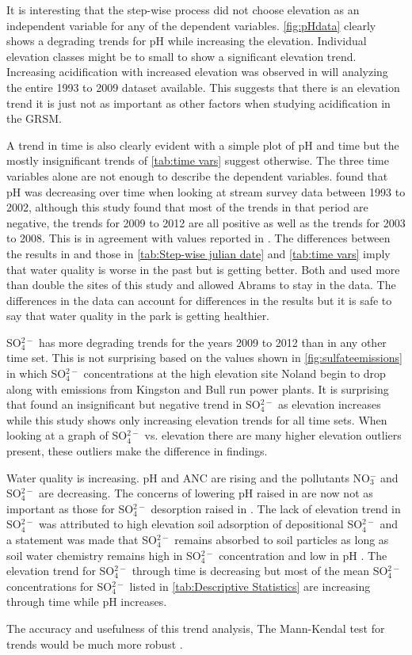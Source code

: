 It is interesting that the step-wise process did not choose elevation as an independent variable for any of the dependent variables. \autoref{fig:pHdata} clearly shows a degrading trends for pH while increasing the elevation. Individual elevation classes might be to small to show a significant elevation trend.  Increasing acidification with increased elevation was observed in \citet{cai2012} will analyzing the entire 1993 to 2009 dataset available.  This suggests that there is an elevation trend it is just not as important as other factors when studying acidification in the GRSM.

A trend in time is also clearly evident with a simple plot of pH and time but the mostly insignificant trends of \autoref{tab:time vars} suggest otherwise. The three time variables alone are not enough to describe the dependent variables.  \citet{robinson2008ph} found that pH was decreasing over time when looking at stream survey data between 1993 to 2002, although this study found that most of the trends in that period are negative, the trends for 2009 to 2012 are all positive as well as the trends for 2003 to 2008.  This is in agreement with values reported in \citet{cai2012}.  The differences between the results in \citet{robinson2008ph} and those in \autoref{tab:Step-wise julian date} and \autoref{tab:time vars} imply that water quality is worse in the past but is getting better.  Both \citet{robinson2008ph} and \citet{cai2012} used more than double the sites of this study and \citet{robinson2008ph} allowed Abrams to stay in the data.  The differences in the data can account for differences in the results but it is safe to say that water quality in the park is getting healthier.

SO$_4^{2-}$ has more degrading trends for the years 2009 to 2012 than in any other time set. This is not surprising based on the values shown in \autoref{fig:sulfateemissions} in which SO$_4^{2-}$ concentrations at the high elevation site Noland begin to drop along with emissions from Kingston and Bull run power plants.  It is surprising that \cite{cai2012} found an insignificant but negative trend in SO$_4^{2-}$ as elevation increases while this study shows only increasing elevation trends for all time sets.  When looking at a graph of SO$_4^{2-}$ vs. elevation there are many higher elevation outliers present, these outliers make the difference in findings.%

Water quality is increasing.  pH and ANC are rising and the pollutants NO$_3^-$ and SO$_4^{2-}$ are decreasing.  The concerns of lowering pH raised in \citet{robinson2008ph} are now not as important as those for SO$_4^{2-}$ desorption raised in \citet{cai2012}.  The lack of elevation trend in SO$_4^{2-}$ was attributed to high elevation soil adsorption of depositional SO$_4^{2-}$ and a statement was made that SO$_4^{2-}$ remains absorbed to soil particles as long as soil water chemistry remains high in SO$_4^{2-}$ concentration and low in pH \citep{cai2011long}.  The elevation trend for SO$_4^{2-}$ through time is decreasing but most of the mean SO$_4^{2-}$ concentrations for SO$_4^{2-}$  listed in \autoref{tab:Descriptive Statistics} are increasing through time while pH increases.

The accuracy and usefulness of this trend analysis, %
The Mann-Kendal test for trends would be much more robust \citep{helsel1992statistical}.	

